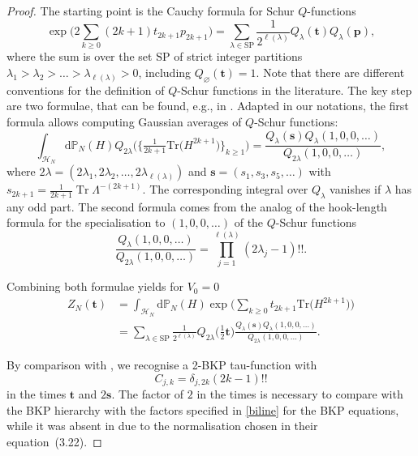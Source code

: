 \documentclass[10pt,a4paper]{amsart}
\numberwithin{equation}{section}
\newcommand{\dd}{\mathrm{d}}
\begin{document}
\begin{proof}
The starting point is the Cauchy formula for Schur $Q$-functions
\[
 \exp\biggl(2\sum_{k \geq 0} (2k+1) t_{2k+1}p_{2k+1}\biggr)
 =\sum_{\lambda \in \text{SP}} \frac{1}{2^{\ell(\lambda)}}
 Q_\lambda(\mathbf{t})Q_\lambda(\mathbf{p}),
\]
where the sum is over the set $\text{SP}$ of strict integer partitions
$\lambda_1>\lambda_2>\dots > \lambda_{\ell(\lambda)}>0$,
including $Q_\varnothing(\mathbf{t})=1$. Note that there are different conventions for the definition of $Q$-Schur functions in the literature.
The key step are two formulae, that can be found, e.g., in \cite[equations~(55) and~(56)]{Mironov:2020tjf}. Adapted in our notations, the first formula allows computing Gaussian averages of $Q$-Schur functions:
\begin{equation*}
 \int_{\mathcal{H}_N} \dd \mathbb{P}_N(H)
 Q_{2\lambda}\bigl(\bigl\{\tfrac{1}{2k+1}\mathrm{Tr}\bigl(H^{2k+1}\bigr)\bigr\}_{k \geq 1}\bigr)=
 \frac{Q_\lambda(\mathbf{s})
 Q_\lambda(1,0,0,\dots)}{Q_{2\lambda}(1,0,0,\dots)} ,
\end{equation*}
where $2\lambda=(2\lambda_1,2\lambda_2,\dots,2\lambda_{\ell(\lambda)})$
and $\mathbf{s}=(s_1,s_3,s_5,\dots)$
with $s_{2k+1}=\frac{1}{2k+1}\operatorname{Tr}\Lambda^{-(2k+1)}$.
The corresponding integral over $Q_\lambda$ vanishes if $\lambda$
has any odd part. The second formula comes from the analog of the hook-length formula for the specialisation to $(1,0,0,\dots)$ of the $Q$-Schur functions
\[
\frac{Q_\lambda(1,0,0,\dots)}{Q_{2\lambda}(1,0,0,\dots)}
=\prod_{j=1}^{\ell(\lambda)} (2\lambda_j-1)!!.
\]

Combining both formulae yields for $V_0 = 0$
\begin{align}
Z_N(\mathbf{t}) & = \int_{\mathcal{H}_N} \dd \mathbb{P}_N(H)
 \exp\biggl(\sum_{k \geq 0} t_{2k+1} \mathrm{Tr}\bigl(H^{2k+1}\bigr)\biggr) \nonumber\\
& =\sum_{\lambda \in \text{SP}} \frac{1}{2^{\ell(\lambda)}}
Q_{2\lambda}\bigl(\tfrac{1}{2}\mathbf{t}\bigr)
\frac{Q_\lambda(\mathbf{s})
 Q_\lambda(1,0,0,\dots)}{Q_{2\lambda}(1,0,0,\dots)} .\label{ZNt}
 \end{align}

By comparison with \cite[Lemma 5.5]{MMNO}, we recognise a 2-BKP tau-function with
\[
C_{j,k} = \delta_{j,2k} (2k - 1)!!
\]
in the times $\mathbf{t}$ and $2\mathbf{s}$. The factor of $2$ in the times is necessary to compare with the BKP hierarchy with the factors specified in \eqref{biline} for the BKP equations, while it was absent in \cite{MMNO} due to the normalisation chosen in their equation~(3.22).
\end{proof}
\end{document}
